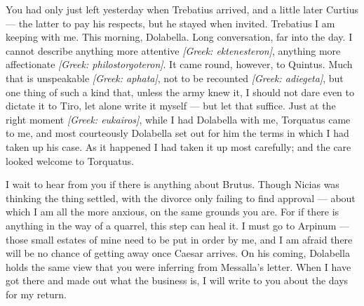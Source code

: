 

 You had only just left yesterday when Trebatius arrived, and a little later Curtius --- the latter to pay his respects, but he stayed when invited. Trebatius I am keeping with me. This morning, Dolabella. Long conversation, far into the day. I cannot describe anything more attentive \textit{[Greek: ektenesteron]}, anything more affectionate \textit{[Greek: philostorgoteron]}. It came round, however, to Quintus. Much that is unspeakable \textit{[Greek: aphata]}, not to be recounted \textit{[Greek: adiegeta]}, but one thing of such a kind that, unless the army knew it, I should not dare even to dictate it to Tiro, let alone write it myself --- but let that suffice. Just at the right moment \textit{[Greek: eukairos]}, while I had Dolabella with me, Torquatus came to me, and most courteously Dolabella set out for him the terms in which I had taken up his case. As it happened I had taken it up most carefully; and the care looked welcome to Torquatus.

 I wait to hear from you if there is anything about Brutus. Though Nicias was thinking the thing settled, with the divorce only failing to find approval --- about which I am all the more anxious, on the same grounds you are. For if there is anything in the way of a quarrel, this step can heal it. I must go to Arpinum --- those small estates of mine need to be put in order by me, and I am afraid there will be no chance of getting away once Caesar arrives. On his coming, Dolabella holds the same view that you were inferring from Messalla's letter. When I have got there and made out what the business is, I will write to you about the days for my return.
